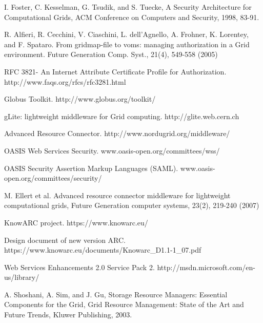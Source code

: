 \documentclass[conference]{IEEEtran}
\begin{document}



%

\begin{thebibliography}{1}

I. Foster, C. Kesselman, G. Tsudik, and S. Tuecke, A Security Architecture for 
Computational Grids, ACM Conference on Computers and Security, 1998, 83-91.

R. Alfieri, R. Cecchini, V. Ciaschini, L. dell’Agnello, A. Frohner, K. Lorentey, 
and F. Spataro. From gridmap-file to voms: managing authorization in a Grid environment. 
Future Generation Comp. Syst., 21(4), 549-558 (2005)

RFC 3821- An Internet Attribute Certificate Profile for Authorization. http://www.faqs.org/rfcs/rfc3281.html

Globus Toolkit. http://www.globus.org/toolkit/

gLite: lightweight middleware for Grid computing. http://glite.web.cern.ch

Advanced Resource Connector. http://www.nordugrid.org/middleware/

OASIS Web Services Security. www.oasis-open.org/committees/wss/

OASIS Security Assertion Markup Languages (SAML). www.oasis-open.org/committees/security/

M. Ellert et al. Advanced resource connector middleware for lightweight computational 
grids, Future Generation computer systems, 23(2), 219-240 (2007)

KnowARC project.  https://www.knowarc.eu/

Design document of new version ARC. https://www.knowarc.eu/documents/Knowarc\_D1.1-1\_07.pdf

Web Services Enhancements 2.0 Service Pack 2. http://msdn.microsoft.com/en-us/library/

A. Shoshani, A. Sim, and J. Gu, Storage Resource Managers: Essential Components for the Grid, 
Grid Resource Management: State of the Art and Future Trends, Kluwer Publishing, 2003.


\end{thebibliography}
\end{document}

